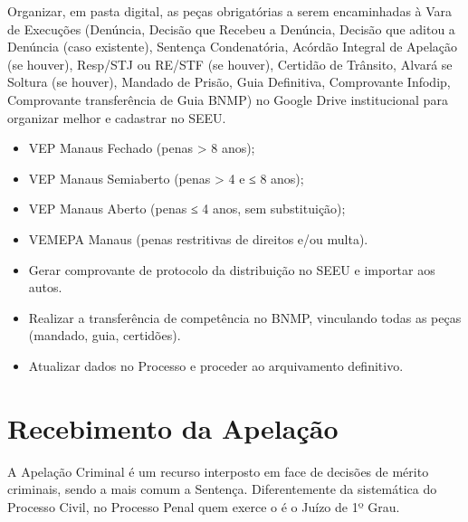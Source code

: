 \documentclass[letterpaper,10pt,brazil]{sphinxmanual}
\begin{document}
\sphinxAtStartPar
{}

\sphinxAtStartPar
Organizar, em pasta digital, as peças obrigatórias a serem encaminhadas à Vara de Execuções (Denúncia, Decisão que Recebeu a Denúncia, Decisão que aditou a Denúncia (caso existente), Sentença Condenatória, Acórdão Integral de Apelação (se houver), Resp/STJ ou RE/STF (se houver), Certidão de Trânsito, Alvará se Soltura (se houver), Mandado de Prisão, Guia Definitiva, Comprovante Infodip, Comprovante transferência de Guia BNMP) no Google Drive institucional para organizar melhor e cadastrar no SEEU.

\sphinxAtStartPar
{}
\begin{itemize}
\item {} 
\sphinxAtStartPar
VEP Manaus \textendash{} Fechado (penas \textgreater{} 8 anos);

\item {} 
\sphinxAtStartPar
VEP Manaus \textendash{} Semiaberto (penas \textgreater{} 4 e ≤ 8 anos);

\item {} 
\sphinxAtStartPar
VEP Manaus \textendash{} Aberto (penas ≤ 4 anos, sem substituição);

\item {} 
\sphinxAtStartPar
VEMEPA Manaus (penas restritivas de direitos e/ou multa).

\end{itemize}

\sphinxAtStartPar
{}
\begin{itemize}
\item {} 
\sphinxAtStartPar
Gerar comprovante de protocolo da distribuição no SEEU e importar aos autos.

\item {} 
\sphinxAtStartPar
Realizar a transferência de competência no BNMP, vinculando todas as peças (mandado, guia, certidões).

\item {} 
\sphinxAtStartPar
Atualizar dados no Processo e proceder ao arquivamento definitivo.

\end{itemize}

\sphinxstepscope


\section{Recebimento da Apelação}
\label{\detokenize{11decisao_recebimento_apelacao:recebimento-da-apelacao}}\label{\detokenize{11decisao_recebimento_apelacao::doc}}
\sphinxAtStartPar
A Apelação Criminal é um recurso interposto em face de decisões de mérito criminais, sendo a mais comum a Sentença.
Diferentemente da sistemática do Processo Civil, no Processo Penal quem exerce o  é o Juízo de 1º Grau.
\end{document}
